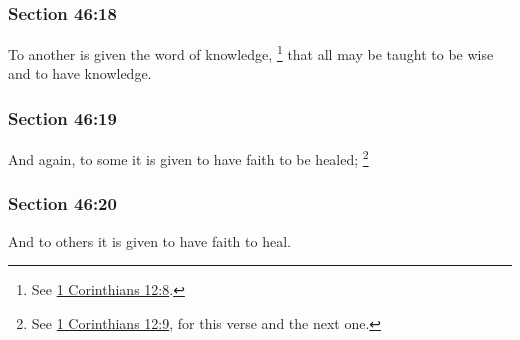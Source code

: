 	\subsubsection{Section 46:18} %
		\label{DC46-18}

		To another is given the word of knowledge,%
			\footnote{%
				See \hyperref[1CORINTHIANS-12-8]{1 Corinthians 12:8}.
				} 
		that all may be taught to be wise and to have knowledge.%


	\subsubsection{Section 46:19} %
		\label{DC46-19}

		And again, to some it is given to have faith to be healed;%
			\footnote{%
				See \hyperref[1CORINTHIANS-12-9]{1 Corinthians 12:9}, for this verse and the next one.
				}


	\subsubsection{Section 46:20} %
		\label{DC46-20}

		And to others it is given to have faith to heal.


